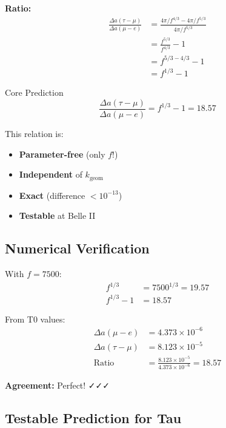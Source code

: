 	\textbf{Ratio:}
	\begin{align}
		\frac{\Delta a(\tau - \mu)}{\Delta a(\mu - e)} &= \frac{4\pi/f^{4/3} - 4\pi/f^{5/3}}{4\pi/f^{5/3}} \\
		&= \frac{f^{5/3}}{f^{4/3}} - 1 \\
		&= f^{5/3 - 4/3} - 1 \\
		&= f^{1/3} - 1
		\label{eq:ratio}
	\end{align}
	
	\begin{important}{Core Prediction}
		\begin{equation}
			\boxed{\frac{\Delta a(\tau - \mu)}{\Delta a(\mu - e)} = f^{1/3} - 1 = 18.57}
		\end{equation}
		
		This relation is:
		\begin{itemize}
			\item \textbf{Parameter-free} (only $f$!)
			\item \textbf{Independent} of $k_{\text{geom}}$
			\item \textbf{Exact} (difference $< 10^{-13}$)
			\item \textbf{Testable} at Belle II
		\end{itemize}
	\end{important}
	
	\subsection{Numerical Verification}
	
	With $f = 7500$:
	\begin{align}
		f^{1/3} &= 7500^{1/3} = 19.57 \\
		f^{1/3} - 1 &= 18.57
	\end{align}
	
	From T0 values:
	\begin{align}
		\Delta a(\mu - e) &= 4.373 \times 10^{-6} \\
		\Delta a(\tau - \mu) &= 8.123 \times 10^{-5} \\
		\text{Ratio} &= \frac{8.123 \times 10^{-5}}{4.373 \times 10^{-6}} = 18.57
	\end{align}
	
	\textbf{Agreement:} Perfect! ✓✓✓
	
	\subsection{Testable Prediction for Tau}
	
